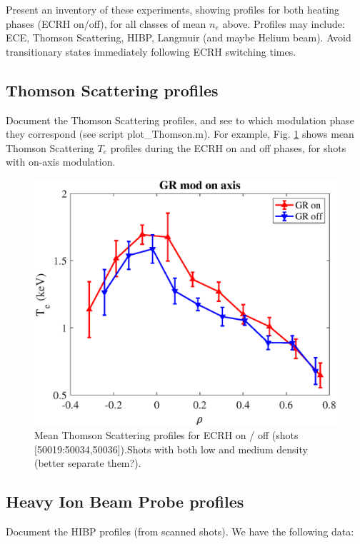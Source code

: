 \documentclass[preprint,12pt,authoryear]{elsarticle}
\begin{document}
Present an inventory of these experiments, showing profiles for both heating phases (ECRH on/off), for all classes of mean $n_e$ above. Profiles may include: ECE, Thomson Scattering, HIBP, Langmuir (and maybe Helium beam). Avoid transitionary states immediately following ECRH switching times.

\subsection{Thomson Scattering profiles}

Document the Thomson Scattering profiles, and see to which modulation phase they correspond (see script plot\_Thomson.m). For example, Fig. \ref{Fig:Thomson} shows mean Thomson Scattering $T_e$ profiles during the ECRH on and off phases, for shots with on-axis modulation.

\begin{figure}[!ht]
\centering
   \includegraphics[width=0.5\columnwidth]{Images/Thomson.eps}
   \caption{Mean Thomson Scattering profiles for ECRH on / off (shots [50019:50034,50036]).Shots with both low and medium density (better separate them?).}
   \label{Fig:Thomson}
\end{figure}

\subsection{Heavy Ion Beam Probe profiles}

Document the HIBP profiles (from scanned shots). We have the following data:
\end{document}
